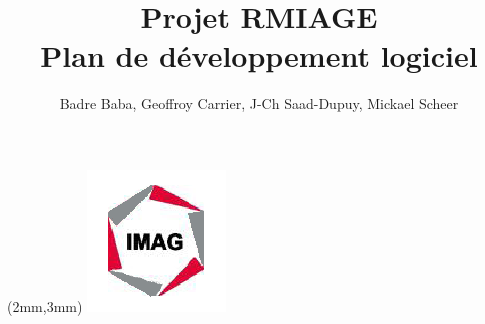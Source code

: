 \documentclass[a4paper,10pt,twoside]{article}
\begin{document}
\title{Projet RMIAGE\\ \Huge{Plan de développement logiciel}}
\author{
	Badre Baba, Geoffroy Carrier, J-Ch Saad-Dupuy, Mickael Scheer
}

\begin{center}
\begin{textblock*}{35cm}(2mm,3mm)
\includegraphics[scale=0.8]{../cc/imag_logo.png}
\end{textblock*}
\end{center}
 
\maketitle






\end{document}
